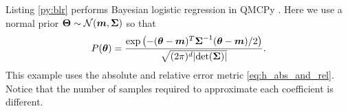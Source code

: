 \documentclass{article}[12pt]
\newcommand{\bvarepsabs}{\boldsymbol{\varepsilon}_\text{abs}}
\newcommand{\bvarepsrel}{\boldsymbol{\varepsilon}_\text{rel}}
\begin{document}
Listing \ref{py:blr} performs Bayesian logistic regression in QMCPy
. Here we use a normal prior $\boldsymbol{\Theta} \sim \mathcal{N}(\boldsymbol{m},\boldsymbol{\Sigma})$ so that
$$P(\boldsymbol{\theta}) = \frac{\exp\left(-(\boldsymbol{\theta}-\boldsymbol{m})^T\boldsymbol{\Sigma}^{-1}(\boldsymbol{\theta}-\boldsymbol{m})/2\right)}{\sqrt{(2\pi)^d\lvert \det(\boldsymbol{\Sigma})\rvert }}.$$
This example uses the absolute and relative error metric \eqref{eq:h_abs_and_rel}. Notice that the number of samples required to approximate each coefficient is different. 





\end{document}
